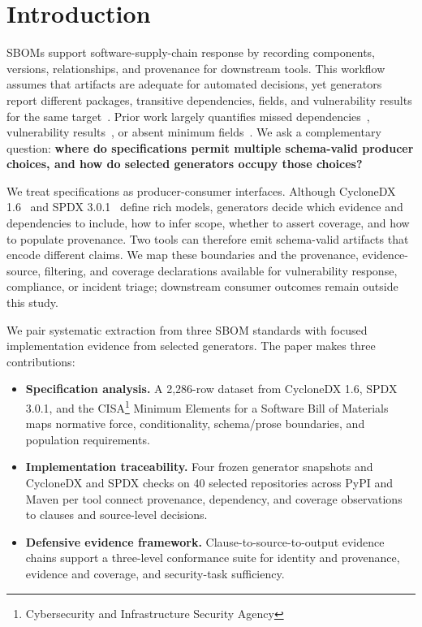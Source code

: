 \section{Introduction}
\label{sec:intro}

SBOMs support software-supply-chain response by recording components, versions, relationships, and provenance for downstream tools. This workflow assumes that artifacts are adequate for automated decisions, yet generators report different packages, transitive dependencies, fields, and vulnerability results for the same target~\cite{xiaempirical2023,bomsaway,balliujava2023,differentialanalysisyu,odonoghuescored2024,benedettipython2024,jbomaudit,cmuplugfest}. Prior work largely quantifies missed dependencies~\cite{balliujava2023,halbritterares2024}, vulnerability results~\cite{odonoghuescored2024,benedettipython2024}, or absent minimum fields~\cite{wangadherencegap2026,halbritterares2024}. We ask a complementary question: \textbf{where do specifications permit multiple schema-valid producer choices, and how do selected generators occupy those choices?}

We treat specifications as producer-consumer interfaces. Although CycloneDX 1.6~\cite{ecma424} and SPDX 3.0.1~\cite{spdx301} define rich models, generators decide which evidence and dependencies to include, how to infer scope, whether to assert coverage, and how to populate provenance. Two tools can therefore emit schema-valid artifacts that encode different claims. We map these boundaries and the provenance, evidence-source, filtering, and coverage declarations available for vulnerability response, compliance, or incident triage; downstream consumer outcomes remain outside this study.

We pair systematic extraction from three SBOM standards with focused implementation evidence from selected generators. The paper makes three contributions:
\begin{itemize}
    \item \textbf{Specification analysis.} A 2,286-row dataset from CycloneDX 1.6, SPDX 3.0.1, and the CISA\footnote{Cybersecurity and Infrastructure Security Agency} Minimum Elements for a Software Bill of Materials maps normative force, conditionality, schema/prose boundaries, and population requirements.
    \item \textbf{Implementation traceability.} Four frozen generator snapshots and CycloneDX and SPDX checks on 40 selected repositories across PyPI and Maven per tool connect provenance, dependency, and coverage observations to clauses and source-level decisions.
    \item \textbf{Defensive evidence framework.} Clause-to-source-to-output evidence chains support a three-level conformance suite for identity and provenance, evidence and coverage, and security-task sufficiency.
\end{itemize}

